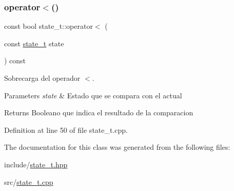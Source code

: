 \subsubsection{\texorpdfstring{operator$<$()}{operator<()}}
{\footnotesize\ttfamily const bool state\+\_\+t\+::operator$<$ (\begin{DoxyParamCaption}\item[{const \hyperlink{classstate__t}{state\+\_\+t}}]{state }\end{DoxyParamCaption}) const}



Sobrecarga del operador \textquotesingle{}$<$\textquotesingle{}. 


\begin{DoxyParams}{Parameters}
{\em state} & Estado que se compara con el actual \\
\hline
\end{DoxyParams}
\begin{DoxyReturn}{Returns}
Booleano que indica el resultado de la comparacion 
\end{DoxyReturn}


Definition at line 50 of file state\+\_\+t.\+cpp.



The documentation for this class was generated from the following files\+:\begin{DoxyCompactItemize}
\item 
include/\hyperlink{state__t_8hpp}{state\+\_\+t.\+hpp}\item 
src/\hyperlink{state__t_8cpp}{state\+\_\+t.\+cpp}\end{DoxyCompactItemize}
